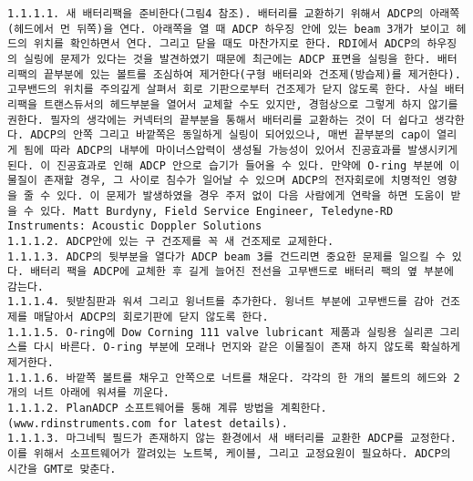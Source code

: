 \documentclass[
]{book}
\begin{document}
\begin{verbatim}
1.1.1.1. 새 배터리팩을 준비한다(그림4 참조). 배터리를 교환하기 위해서 ADCP의 아래쪽(헤드에서 먼 뒤쪽)을 연다. 아래쪽을 열 때 ADCP 하우징 안에 있는 beam 3개가 보이고 헤드의 위치를 확인하면서 연다. 그리고 닫을 때도 마찬가지로 한다. RDI에서 ADCP의 하우징의 실링에 문제가 있다는 것을 발견하였기 때문에 최근에는 ADCP 표면을 실링을 한다. 배터리팩의 끝부분에 있는 볼트를 조심하여 제거한다(구형 배터리와 건조제(방습제)를 제거한다). 고무밴드의 위치를 주의깊게 살펴서 회로 기판으로부터 건조제가 닫지 않도록 한다. 사실 배터리팩을 트랜스듀서의 헤드부분을 열어서 교체할 수도 있지만, 경험상으로 그렇게 하지 않기를 권한다. 필자의 생각에는 커넥터의 끝부분을 통해서 배터리를 교환하는 것이 더 쉽다고 생각한다. ADCP의 안쪽 그리고 바깥쪽은 동일하게 실링이 되어있으나, 매번 끝부분의 cap이 열리게 됨에 따라 ADCP의 내부에 마이너스압력이 생성될 가능성이 있어서 진공효과를 발생시키게 된다. 이 진공효과로 인해 ADCP 안으로 습기가 들어올 수 있다. 만약에 O-ring 부분에 이물질이 존재할 경우, 그 사이로 침수가 일어날 수 있으며 ADCP의 전자회로에 치명적인 영향을 줄 수 있다. 이 문제가 발생하였을 경우 주저 없이 다음 사람에게 연락을 하면 도움이 받을 수 있다. Matt Burdyny, Field Service Engineer, Teledyne-RD Instruments: Acoustic Doppler Solutions
1.1.1.2. ADCP안에 있는 구 건조제를 꼭 새 건조제로 교제한다.
1.1.1.3. ADCP의 뒷부분을 열다가 ADCP beam 3를 건드리면 중요한 문제를 일으킬 수 있다. 배터리 팩을 ADCP에 교체한 후 길게 늘어진 전선을 고무밴드로 배터리 팩의 옆 부분에 감는다.
1.1.1.4. 뒷받침판과 워셔 그리고 윙너트를 추가한다. 윙너트 부분에 고무밴드를 감아 건조제를 매달아서 ADCP의 회로기판에 닫지 않도록 한다.
1.1.1.5. O-ring에 Dow Corning 111 valve lubricant 제품과 실링용 실리콘 그리스를 다시 바른다. O-ring 부분에 모래나 먼지와 같은 이물질이 존재 하지 않도록 확실하게 제거한다.
1.1.1.6. 바깥쪽 볼트를 채우고 안쪽으로 너트를 채운다. 각각의 한 개의 볼트의 헤드와 2개의 너트 아래에 워셔를 끼운다.
1.1.1.2. PlanADCP 소프트웨어를 통해 계류 방법을 계획한다. (www.rdinstruments.com for latest details). 
1.1.1.3. 마그네틱 필드가 존재하지 않는 환경에서 새 배터리를 교환한 ADCP를 교정한다. 이를 위해서 소프트웨어가 깔려있는 노트북, 케이블, 그리고 교정요원이 필요하다. ADCP의 시간을 GMT로 맞춘다.
\end{verbatim}
\end{document}
